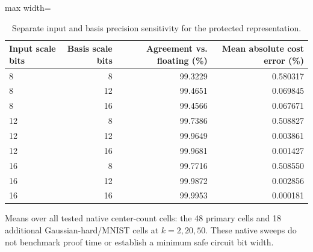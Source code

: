 \begin{table}[tp]
\caption{Separate input and basis precision sensitivity for the protected representation.}\label{tab:precision}
\centering\small
\begin{adjustbox}{max width=\textwidth}
\begin{tabular}{@{}lrrr@{}}
\toprule
Input scale bits & Basis scale bits & Agreement vs. floating (\%) & Mean absolute cost error (\%) \\
\midrule
8 & 8 & 99.3229 & 0.580317 \\
8 & 12 & 99.4651 & 0.069845 \\
8 & 16 & 99.4566 & 0.067671 \\
12 & 8 & 99.7386 & 0.508827 \\
12 & 12 & 99.9649 & 0.003861 \\
12 & 16 & 99.9681 & 0.001427 \\
16 & 8 & 99.7716 & 0.508550 \\
16 & 12 & 99.9872 & 0.002856 \\
16 & 16 & 99.9953 & 0.000181 \\
\bottomrule
\end{tabular}
\end{adjustbox}
\par\vspace{3pt}\begin{minipage}{0.98\textwidth}\footnotesize Means over all tested native center-count cells: the 48 primary cells and 18 additional Gaussian-hard/MNIST cells at $k=2,20,50$. These native sweeps do not benchmark proof time or establish a minimum safe circuit bit width.\end{minipage}
\end{table}
